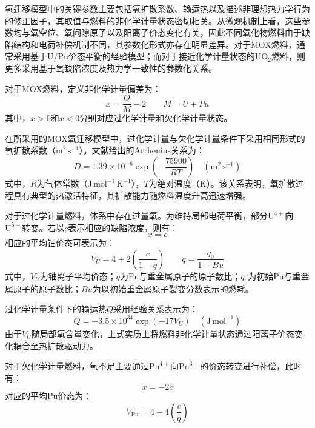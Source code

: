 氧迁移模型中的关键参数主要包括氧扩散系数、输运热以及描述非理想热力学行为的修正因子，其取值与燃料的非化学计量状态密切相关。从微观机制上看，这些参数均与氧空位、氧间隙原子以及阳离子价态变化有关，因此不同氧化物燃料由于缺陷结构和电荷补偿机制不同，其参数化形式亦存在明显差异。对于MOX燃料，通常采用基于U/Pu价态平衡的经验模型；而对于接近化学计量状态的UO$_2$燃料，则更多采用基于氧缺陷浓度及热力学一致性的参数化关系。

对于MOX燃料，定义非化学计量偏差为：
\begin{equation}
	x=\frac{O}{M}-2
	\qquad
	M=U+Pu 
\end{equation}
其中，$x>0$和$x<0$分别对应过化学计量和欠化学计量状态。

在所采用的MOX氧迁移模型中，过化学计量与欠化学计量条件下采用相同形式的氧扩散系数（$\mathrm{m^2\,s^{-1}}$）。文献给出的Arrhenius关系为：
\begin{equation}
	D
	=
	1.39\times10^{-6}
	\exp\left(
	-\frac{75900}{RT}
	\right)
	\quad
	\left(\mathrm{m^2\,s^{-1}}\right)
\end{equation}
\noindent 式中，$R$为气体常数（$\mathrm{J\,mol^{-1}\,K^{-1}}$），$T$为绝对温度（$\mathrm{K}$）。该关系表明，氧扩散过程具有典型的热激活特征，其扩散能力随燃料温度升高迅速增强。

对于过化学计量燃料，体系中存在过量氧。为维持局部电荷平衡，部分$\mathrm{U}^{4+}$向$\mathrm{U}^{5+}$转变。若以$c$表示相应的缺陷浓度，则有：
\begin{equation}
	x=c 
\end{equation}
相应的平均铀价态可表示为：
\begin{equation}
	V_U
	=
	4+
	2\left(
	\frac{c}{1-q}
	\right)
	\qquad
	q=\frac{q_0}{1-Bu}
\end{equation}
\noindent 式中，$V_U$为铀离子平均价态；$q$为Pu与重金属原子的原子数比；$q_0$为初始Pu与重金属原子的原子数比；$Bu$为以初始重金属原子裂变分数表示的燃耗。

过化学计量条件下的输运热$Q$采用经验关系表示为：
\begin{equation}
	Q
	=
	-3.5\times10^{34}
	\exp\left(-17V_U\right)
	\quad
	\left(\mathrm{J\,mol^{-1}}\right)
\end{equation}
由于$V_U$随局部氧含量变化，上式实质上将燃料非化学计量状态通过阳离子价态变化耦合至热扩散驱动力。

对于欠化学计量燃料，氧不足主要通过$\mathrm{Pu}^{4+}$向$\mathrm{Pu}^{3+}$的价态转变进行补偿，此时有：
\begin{equation}
	x=-2c 
\end{equation}
对应的平均Pu价态为：
\begin{equation}
	V_{\mathrm{Pu}}
	=
	4-
	4\left(
	\frac{c}{q}
	\right)
\end{equation}

